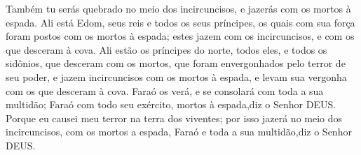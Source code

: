 {  Também tu serás quebrado no meio dos incircuncisos, e jazerás com os mortos à espada.
  Ali está Edom, seus reis e todos os seus príncipes, os quais com sua força foram postos com os mortos à espada; estes jazem com os incircuncisos, e com os que desceram à cova.
  Ali estão os príncipes do norte, todos eles, e todos os sidônios, que desceram com os mortos, que foram envergonhados pelo terror de seu poder, e jazem incircuncisos com os mortos à espada, e levam sua vergonha com os que desceram à cova.
  Faraó os verá, e se consolará com toda a sua multidão; Faraó com todo seu exército, mortos à espada,diz o Senhor DEUS.
  Porque eu causei meu terror na terra dos viventes; por isso jazerá no meio dos incircuncisos, com os mortos a espada, Faraó e toda a sua multidão,diz o Senhor DEUS.
\par }

